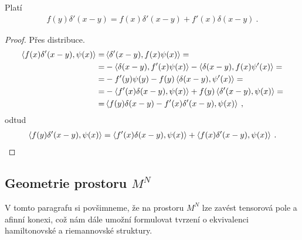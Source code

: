 \begin{lemma} \label{lemma:delta}
    Platí
    \begin{align}
        f(y) \delta'(x-y) = f(x) \delta'(x-y) + f'(x) \delta(x-y) \:.
    \end{align}
\end{lemma}
\begin{proof}
    Přes distribuce.
    \begin{align*}
        \left \langle f(x) \delta'(x-y) ,\psi(x) \right \rangle 
        =& \left \langle \delta'(x-y) ,f(x) \psi(x) \right \rangle 
        = \\ =& -\left \langle \delta(x-y) ,f'(x)\psi(x) \right \rangle - \left \langle \delta(x-y) ,f(x)\psi'(x) \right \rangle 
        = \\ =& -f'(y) \psi(y) - f(y) \left \langle \delta(x-y) ,\psi'(x) \right \rangle 
        = \\ =& - \left \langle f'(x)  \delta(x-y) ,\psi(x) \right \rangle + f(y) \left \langle \delta'(x-y) ,\psi(x) \right \rangle 
        = \\ =& \left \langle f(y) \delta(x-y) - f'(x) \delta'(x-y) ,\psi(x) \right \rangle \:,
    \end{align*}
    odtud
    \begin{align}
        \left \langle f(y) \delta'(x-y) ,\psi(x) \right \rangle = \left \langle f'(x) \delta(x-y) ,\psi(x) \right \rangle + \left \langle f(x) \delta'(x-y) ,\psi(x) \right \rangle \:.
    \end{align} 
\end{proof}

\subsection{Geometrie prostoru $M^N$}

V tomto paragrafu si povšimneme, že na prostoru $M^N$ lze zavést tensorová pole a afinní konexi, což nám dále umožní formulovat tvrzení o ekvivalenci hamiltonovské a riemannovské struktury.

